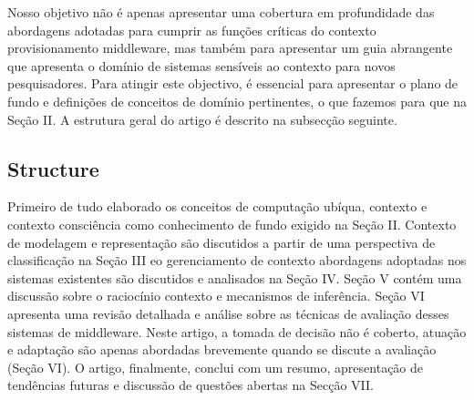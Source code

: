 \documentclass[12pt]{article} %
\begin{document}

Nosso objetivo não é apenas apresentar uma cobertura em profundidade das abordagens adotadas para cumprir as funções críticas do contexto provisionamento middleware, mas também para apresentar um guia abrangente que apresenta o domínio de sistemas sensíveis ao contexto para novos pesquisadores. Para atingir este objectivo, é essencial para apresentar o plano de fundo e definições de conceitos de domínio pertinentes, o que fazemos para que na Seção II. A estrutura geral do artigo é descrito na subsecção seguinte.


\subsection{Structure} %


Primeiro de tudo elaborado os conceitos de computação ubíqua, contexto e contexto consciência como conhecimento de fundo exigido na Seção II. Contexto de modelagem e representação são discutidos a partir de uma perspectiva de classificação na Seção III eo gerenciamento de contexto abordagens adoptadas nos sistemas existentes são discutidos e analisados ​​na Seção IV. Seção V contém uma discussão sobre o raciocínio contexto e mecanismos de inferência. Seção VI apresenta uma revisão detalhada e análise sobre as técnicas de avaliação desses sistemas de middleware. Neste artigo, a tomada de decisão não é coberto, atuação e adaptação são apenas abordadas brevemente quando se discute a avaliação (Seção VI). O artigo, finalmente, conclui com um resumo, apresentação de tendências futuras e discussão de questões abertas na Secção VII.
\end{document}
